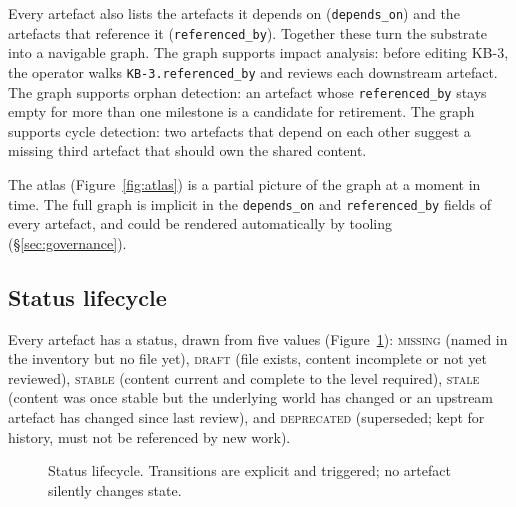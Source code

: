 \documentclass[11pt,a4paper,twocolumn]{article}
\begin{document}
Every artefact also lists the artefacts it depends on
(\texttt{depends\_on}) and the artefacts that reference it
(\texttt{referenced\_by}). Together these turn the substrate into a
navigable graph. The graph supports impact analysis: before editing
KB-3, the operator walks \texttt{KB-3.referenced\_by} and
reviews each downstream artefact. The graph supports orphan
detection: an artefact whose \texttt{referenced\_by} stays empty
for more than one milestone is a candidate for retirement. The
graph supports cycle detection: two artefacts that depend on each
other suggest a missing third artefact that should own the shared
content.

The atlas (Figure~\ref{fig:atlas}) is a partial picture of the
graph at a moment in time. The full graph is implicit in the
\texttt{depends\_on} and \texttt{referenced\_by} fields of every
artefact, and could be rendered automatically by tooling
(\S\ref{sec:governance}).

\subsection{Status lifecycle}

Every artefact has a status, drawn from five values
(Figure~\ref{fig:status}): \textsc{missing} (named in the inventory
but no file yet), \textsc{draft} (file exists, content incomplete
or not yet reviewed), \textsc{stable} (content current and complete
to the level required), \textsc{stale} (content was once stable
but the underlying world has changed or an upstream artefact has
changed since last review), and \textsc{deprecated} (superseded;
kept for history, must not be referenced by new work).

\begin{figure}[t]
\centering
{}
\caption{Status lifecycle. Transitions are explicit and triggered;
no artefact silently changes state.}
\label{fig:status}
\end{figure}
\end{document}
